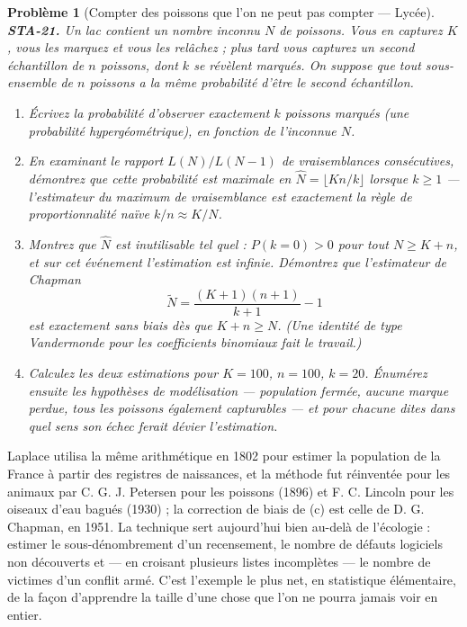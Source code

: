 \documentclass[11pt]{article}
\newtheorem{problem}{Problème}
\begin{document}
\begin{problem}[{Compter des poissons que l'on ne peut pas compter --- Lycée}]
\textbf{STA-21.} Un lac contient un nombre inconnu $ N $ de poissons. Vous en capturez
$ K $, vous les marquez et vous les relâchez ; plus tard vous capturez un second échantillon de
$ n $ poissons, dont $ k $ se révèlent marqués. On suppose que tout sous-ensemble de $ n $
poissons a la même probabilité d'être le second échantillon.
\begin{enumerate}
\item[(a)] Écrivez la probabilité d'observer exactement $ k $ poissons marqués (une probabilité
hypergéométrique), en fonction de l'inconnue $ N $.
\item[(b)] En examinant le rapport $ L(N)/L(N-1) $ de vraisemblances consécutives, démontrez que cette
probabilité est maximale en $ \hat{N} = \lfloor Kn/k \rfloor $ lorsque $ k \ge 1 $ ---
l'estimateur du maximum de vraisemblance est exactement la règle de proportionnalité naïve
$ k/n \approx K/N $.
\item[(c)] Montrez que $ \hat{N} $ est inutilisable tel quel : $ P(k = 0) >0 $ pour tout
$ N \ge K + n $, et sur cet événement l'estimation est infinie. Démontrez que l'estimateur de
Chapman
\[ \tilde{N} = \frac{(K+1)(n+1)}{k+1} - 1 \]
est exactement sans biais dès que $ K + n \ge N $. (Une identité de type Vandermonde pour les
coefficients binomiaux fait le travail.)
\item[(d)] Calculez les deux estimations pour $ K = 100 $, $ n = 100 $, $ k = 20 $. Énumérez ensuite
les hypothèses de modélisation --- population fermée, aucune marque perdue, tous les poissons
également capturables --- et pour chacune dites dans quel sens son échec ferait dévier
l'estimation.
\end{enumerate}

\end{problem}

\noindent Laplace utilisa la même arithmétique en 1802 pour estimer la population de la
France à partir des registres de naissances, et la méthode fut réinventée pour les animaux par
C. G. J. Petersen pour les poissons (1896) et F. C. Lincoln pour les oiseaux d'eau bagués (1930) ;
la correction de biais de (c) est celle de D. G. Chapman, en 1951. La technique sert aujourd'hui
bien au-delà de l'écologie : estimer le sous-dénombrement d'un recensement, le nombre de défauts
logiciels non découverts et --- en croisant plusieurs listes incomplètes --- le nombre de victimes d'un
conflit armé. C'est l'exemple le plus net, en statistique élémentaire, de la façon d'apprendre la
taille d'une chose que l'on ne pourra jamais voir en entier.
\end{document}
